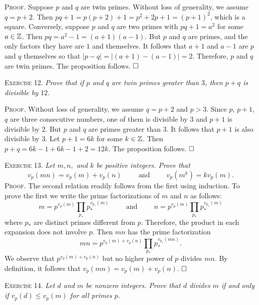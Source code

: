 \documentclass[11pt, leqno]{article}
\newcommand{\done}{\ensuremath{\hfill\square}}
\begin{document}
\textsc{Proof}. Suppose $p$ and $q$ are twin primes. Without loss of generality, we assume $q = p+2$. Then $pq+1 = p(p+2) + 1 = p^2 + 2p + 1 = (p+1)^2$, which is a square. Conversely, suppose $p$ and $q$ are two primes with $pq+1 = a^2$ for some $a\in\mathbb{Z}$. Then $pq = a^2-1 = (a+1)(a-1)$. But $p$ and $q$ are primes, and the only factors they have are $1$ and themselves. It follows that $a+1$ and $a-1$ are $p$ and $q$ themselves so that $|p-q| = |(a+1)-(a-1)| =  2$. Therefore, $p$ and $q$ are twin primes. The proposition follows. \done

\textsc{Exercise 12}. \emph{Prove that if $p$ and $q$ are twin primes greater than $3$, then $p+q$ is divisible by $12$.}

\textsc{Proof}. Without loss of generality, we assume $q = p+2$ and $p>3$. Since $p$, $p+1$, $q$ are three consecutive numbers, one of them is divisible by $3$ and $p+1$ is divisible by $2$. But $p$ and $q$ are primes greater than $3$. It follows that $p+1$ is also divisible by $3$. Let $p+1 = 6k$ for some $k\in\mathbb{Z}$. Then $p+q = 6k - 1 + 6k-1 + 2 = 12k$. The proposition follows. \done

\textsc{Exercise 13}. \emph{Let $m, n,$ and $k$ be positive integers. Prove that 
\begin{displaymath}
v_p(mn) = v_p(m) + v_p(n) \hspace{1cm}\text{and}\hspace{1cm} v_p(m^k) = kv_p(m).
\end{displaymath}}\textsc{Proof}. The second relation readily follows from the first using induction. To prove the first we write the prime factorizations of $m$ and $n$ as follows: 
\begin{displaymath}
m = p^{v_p(m)}\prod_{p_{*}}^{} p_{*}^{v_{p_{*}}(m)} \hspace{1cm}\text{and}\hspace{1cm} n = p^{v_p(m)}\prod_{p_{*}}^{} p_{*}^{v_{p_{*}}(m)}
\end{displaymath}
where $p_{*}$ are distinct primes different from $p$. Therefore, the product in each expansion does not involve $p$. Then $mn$ has the prime factorization 
\begin{displaymath}
mn = p^{v_p(m)+v_p(n)}\prod_{p_{*}}^{}p_{*}^{v_{p_{*}}(mn)}.
\end{displaymath}
We observe that $p^{v_p(m)+v_p(n)}$ but no higher power of $p$ divides $mn$. By definition, it follows that $v_p(mn) = v_p(m) + v_p(n)$. \done

\textsc{Exercise 14}. \emph{Let $d$ and $m$ be nonzero integers. Prove that $d$ divides $m$ if and only if $v_p(d)\leq v_p(m)$ for all primes $p$.}
\end{document}
